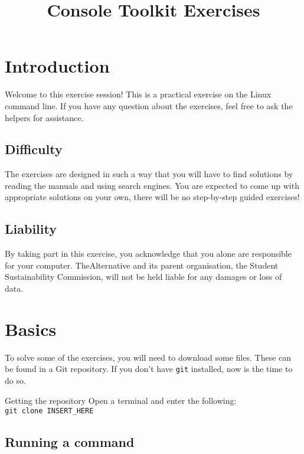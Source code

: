 \documentclass{TheAlternativeCourse}
\title{Console Toolkit Exercises}
\date{}
\begin{document}
\maketitle

\section{Introduction}

Welcome to this exercise session! This is a practical exercise on the Linux
command line.  If you have any question about the exercises, feel free to ask
the helpers for assistance.


\subsection*{Difficulty}

The exercises are designed in such a way that you will have to find solutions
by reading the manuals and using search engines. You are expected to come up
with appropriate solutions on your own, there will be no step-by-step guided
exercises!

\subsection*{Liability}

By taking part in this exercise, you acknowledge that you alone are responsible
for your computer. TheAlternative and its parent organisation, the Student
Sustainability Commission, will not be held liable for any damages or loss of
data.

\pagebreak

\section{Basics}

To solve some of the exercises, you will need to download some files. These
can be found in a Git repository. If you don't have \texttt{git} installed,
now is the time to do so. \\
%
\begin{exercisebox}{Getting the repository}
    Open a terminal and enter the following: \\
    \texttt{git clone INSERT\_HERE}
\end{exercisebox}

\subsection{Running a command}
\end{document}

